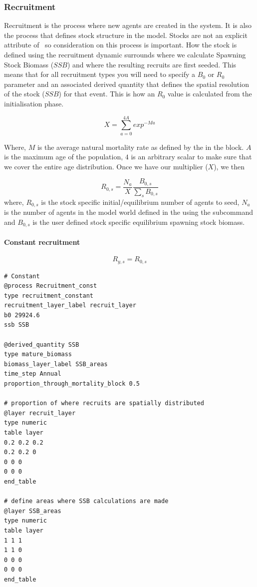 \subsubsection{Recruitment}\label{sec:recruitment}
Recruitment is the process where new agents are created in the system. It is also the process that defines stock structure in the model. Stocks are not an explicit attribute of \IBM\ so consideration on this process is important. How the stock is defined using the recruitment dynamic surrounds where we calculate Spawning Stock Biomass ($SSB$) and where the resulting recruits are first seeded. This means that for all recruitment types you will need to specify a $B_0$ or \(R_0\) parameter and an associated derived quantity that defines the spatial resolution of the stock ($SSB$) for that event. This is how an $R_0$ value is calculated from the initialisation phase.

\begin{equation}
	X = \sum_{a = 0}^{4A}exp^{-M a}
\end{equation}

Where, $M$ is the average natural mortality rate as defined by the  in the  block. $A$ is the maximum age of the population, $4$ is an arbitrary scalar to make sure that we cover the entire age distribution. Once we have our multiplier ($X$), we then


\begin{equation}
R_{0,s} = \frac{N_a}{X} \frac{B_{0,s}}{\sum_s B_{0,s}}
\end{equation}
where, $R_{0,s}$ is the stock specific initial/equilibrium number of agents to seed, $N_a$ is the number of agents in the model world defined in the  using the subcommand  and $B_{0,s}$ is the user defined stock specific equilibrium spawning stock biomass.

\paragraph{Constant recruitment}\label{subsubsec:constant-recruitment}

\begin{equation}
	R_{y,s} = R_{0,s}
\end{equation}

{\small{\begin{verbatim}
# Constant
@process Recruitment_const
type recruitment_constant
recruitment_layer_label recruit_layer
b0 29924.6 
ssb SSB

@derived_quantity SSB
type mature_biomass
biomass_layer_label SSB_areas
time_step Annual
proportion_through_mortality_block 0.5

# proportion of where recruits are spatially distributed
@layer recruit_layer
type numeric
table layer
0.2 0.2 0.2
0.2 0.2 0
0 0 0
0 0 0	
end_table

# define areas where SSB calculations are made
@layer SSB_areas
type numeric
table layer
1 1 1
1 1 0
0 0 0
0 0 0	
end_table
\end{verbatim}}}
	
